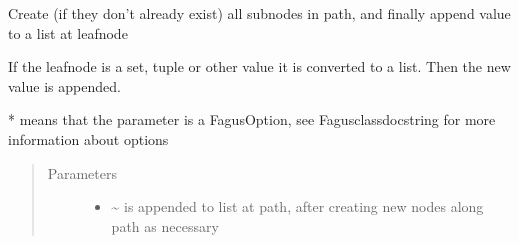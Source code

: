 \documentclass[a4paper,10pt,english]{sphinxmanual}
\begin{document}
\begin{fulllineitems}
\begin{fulllineitems}
\label{\detokenize{fagus:fagus.Fagus.append}}
\pysigstartsignatures
{}
\pysigstopsignatures
\sphinxAtStartPar
Create (if they don’t already exist) all sub\sphinxhyphen{}nodes in path, and finally append value to a list at leaf\sphinxhyphen{}node

\sphinxAtStartPar
If the leaf\sphinxhyphen{}node is a set, tuple or other value it is converted to a list. Then the new value is appended.

\sphinxAtStartPar
* means that the parameter is a FagusOption, see Fagus\sphinxhyphen{}class\sphinxhyphen{}docstring for more information about options
\begin{quote}\begin{description}
\item[{Parameters}] \leavevmode\begin{itemize}
\item {}
\sphinxAtStartPar
{} \textendash{} \textasciitilde{} is appended to list at path, after creating new nodes along path as necessary


\end{itemize}
\end{description}
\end{quote}
\end{fulllineitems}
\end{fulllineitems}
\end{document}
